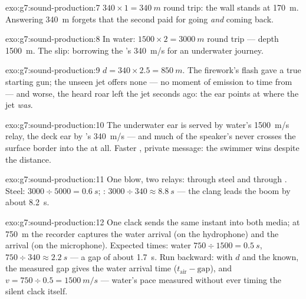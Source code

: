\begin{solution}{exo:g7:sound-production:7}
$340 \times 1 = \qty{340}{m}$ round trip: the wall stands at
\qty{170}{m}. Answering \qty{340}{m} forgets that the second
paid for going \emph{and} coming back.
\end{solution}

\begin{solution}{exo:g7:sound-production:8}
In water: $1500 \times 2 = \qty{3000}{m}$ round trip --- depth
\qty{1500}{m}. The slip: borrowing the 's \qty{340}{m/s} for
an underwater journey.
\end{solution}

\begin{solution}{exo:g7:sound-production:9}
$d = 340 \times 2.5 = \qty{850}{m}$. The firework's flash gave a
true starting gun; the unseen jet offers none --- no moment of
emission to time from --- and worse, the heard roar left the jet
seconds ago: the ear points at where the jet \emph{was}.
\end{solution}

\begin{solution}{exo:g7:sound-production:10}
The underwater ear is served by water's \qty{1500}{m/s} relay,
the deck ear by 's \qty{340}{m/s} --- and much of the
speaker's  never crosses the surface border into the  at
all. Faster , private message: the swimmer wins despite
the distance.
\end{solution}

\begin{solution}{exo:g7:sound-production:11}
One blow, two relays: through steel and through . Steel:
$3000 \div 5000 = \qty{0.6}{s}$; : $3000 \div 340 \approx
\qty{8.8}{s}$ --- the clang leads the boom by about
\qty{8.2}{s}.
\end{solution}

\begin{solution}{exo:g7:sound-production:12}
One clack sends the same instant into both media; at
\qty{750}{m} the recorder captures the water arrival (on the
hydrophone) and the  arrival (on the microphone). Expected
times: water $750 \div 1500 = \qty{0.5}{s}$,  $750 \div 340
\approx \qty{2.2}{s}$ --- a gap of about \qty{1.7}{s}. Run
backward: with $d$ and the   known, the measured gap
gives the water arrival time ($t_{\text{air}} -
\text{gap}$), and $v = 750 \div 0.5 = \qty{1500}{m/s}$ ---
water's pace measured without ever timing the silent clack
itself.
\end{solution}

